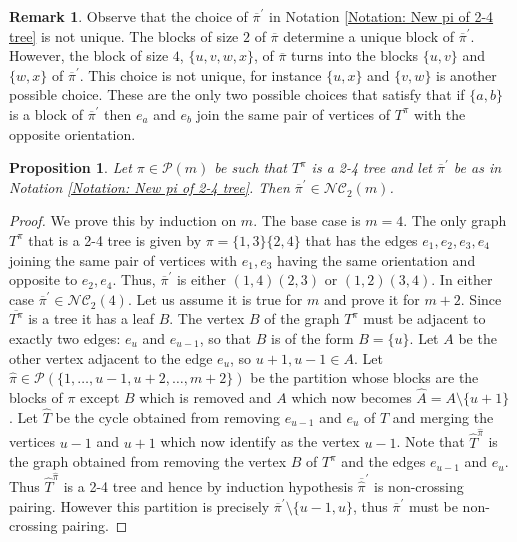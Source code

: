 \documentclass{article}
\newtheorem{proposition}[theorem]{Proposition}
\theoremstyle{definition}
\newtheorem{remark}     [theorem]{Remark}
\newcommand{\cP}{\mathcal{P}}
\newcommand{\NC}{\mathcal{NC}}
\begin{document}
{\begin{remark}
Observe that the choice of $\overline{\pi}^\prime$ in Notation \ref{Notation: New pi of 2-4 tree} is not unique. The blocks of size $2$ of $\overline{\pi}$ determine a unique block of $\overline{\pi}^\prime$. However, the block of size $4$, $\{u,v,w,x\}$, of $\overline{\pi}$ turns into the blocks $\{u,v\}$ and $\{w,x\}$ of $\overline{\pi}^\prime$. This choice is not unique, for instance $\{u,x\}$ and $\{v,w\}$ is another possible choice. These are the only two possible choices that satisfy that if $\{a,b\}$ is a block of $\overline{\pi}^\prime$ then $e_a$ and $e_b$ join the same pair of vertices of $T^\pi$ with the opposite orientation.
\end{remark}

\begin{proposition}\label{Proposition: pi prime is non-crossing}
Let $\pi\in \cP(m)$ be such that $T^\pi$ is a 2-4 tree and let $\overline{\pi}^\prime$ be as in Notation \ref{Notation: New pi of 2-4 tree}. Then $\overline{\pi}^\prime\in \NC_2(m)$.
\end{proposition}
\begin{proof}
We prove this by induction on $m$. The base case is $m=4$. The only graph $T^\pi$ that is a 2-4 tree is given by $\pi=\{1,3\}\{2,4\}$ that has the edges $e_1,e_2,e_3,e_4$ joining the same pair of vertices with $e_1,e_3$ having the same orientation and opposite to $e_2,e_4$. Thus, $\overline{\pi}^\prime$ is either $(1,4)(2,3)$ or $(1,2)(3,4)$. In either case $\overline{\pi}^\prime\in \NC_2(4)$. Let us assume it is true for $m$ and prove it for $m+2$. Since $\overline{T^\pi}$ is a tree it has a leaf $B$. The vertex $B$ of the graph $T^\pi$ must be adjacent to exactly two edges: $e_{u}$ and $e_{u-1}$, so that $B$ is of the form $B=\{u\}$. Let $A$ be the other vertex adjacent to the edge $e_{u}$, so $u+1,u-1\in A$. Let $\hat{\pi}\in \cP(\{1,\dots,u-1,u+2,\dots,m+2\})$ be the partition whose blocks are the blocks of $\pi$ except $B$ which is removed and $A$ which now becomes $\hat{A}=A\setminus \{u+1\}$. Let $\hat{T}$ be the cycle obtained from removing $e_{u-1}$ and $e_u$ of $T$ and merging the vertices $u-1$ and $u+1$ which now identify as the vertex $u-1$. Note that $\hat{T}^{\hat{\pi}}$ is the graph obtained from removing the vertex $B$ of $T^\pi$ and the edges $e_{u-1}$ and $e_u$. Thus $\hat{T}^{\hat{\pi}}$ is a 2-4 tree and hence by induction hypothesis $\overline{\hat{\pi}}^\prime$ is non-crossing pairing. However this partition is precisely $\overline{\pi}^\prime \setminus \{u-1,u\}$, thus $\overline{\pi}^\prime$ must be non-crossing pairing.
\end{proof}

}
\end{document}
